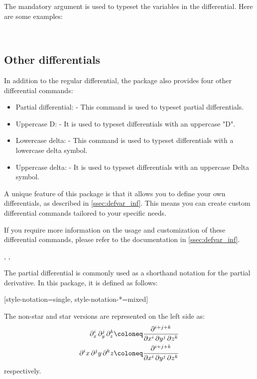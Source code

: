 \begin{function}
	\begin{argument}{3}
		The mandatory argument is used to typeset the variables in the differential. Here are some examples:
		\begin{example}
			 \\
		\end{example}
	\end{argument}
\end{function}

\subsection{Other differentials}
In addition to the regular differential, the package also provides four other differential commands:
\begin{itemize}
	\item Partial differential: \macro{\pdif} - This command is used to typeset partial differentials.
	\item Uppercase D: \macro{\mdif} - It is used to typeset differentials with an uppercase "D".
	\item Lowercase delta: \macro{\fdif} - This command is used to typeset differentials with a lowercase delta symbol.
	\item Uppercase delta: \macro{\adif} - It is used to typeset differentials with an uppercase Delta symbol.
\end{itemize}
A unique feature of this package is that it allows you to define your own differentials, as described in \cref{ssec:defvar_inf}. This means you can create custom differential commands tailored to your specific needs.

If you require more information on the usage and customization of these differential commands, please refer to the documentation in \cref{ssec:defvar_inf}.


\begin{function}{\pdif}
	\begin{syntax}
		\sarg, , 
	\end{syntax}
	The partial differential  is commonly used as a shorthand notation for the partial derivative. In this package, it is defined as follows:
	\begin{definition}
		\DeclareDifferential{\pdif}{\partial}[style-notation=single,
		style-notation-*=mixed]
	\end{definition}

	\noindent The non-star and star versions are represented on the left side as:
	\begin{align*}
		\pdif[order={i,j,k}]{x,y,z} &\coloneq \pdv[order={i,j,k}]{}{x,y,z} \\
		\pdif*[order={i,j,k}]{x,y,z} &\coloneq \pdv[order={i,j,k}]{}{x,y,z}
	\end{align*}
	respectively.
\end{function}


